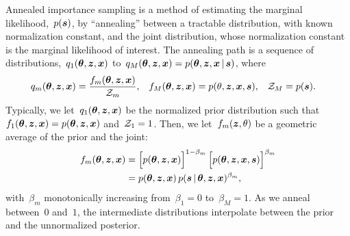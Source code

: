 \sloppy
Annealed importance sampling \citep{neal2001annealed} is a method of
estimating the marginal likelihood,~$p(\boldsymbol{s})$, by ``annealing'' between
a tractable distribution, with known normalization constant, and the
joint distribution, whose normalization constant is the marginal
likelihood of interest. The annealing path is a sequence of
distributions,~${q_1(\boldsymbol{\theta}, \boldsymbol{z}, \boldsymbol{x})}$ to~${q_M(\boldsymbol{\theta}, \boldsymbol{z}, \boldsymbol{x}) = p(\boldsymbol{\theta}, \boldsymbol{z}, \boldsymbol{x} \,|\, \boldsymbol{s})}$,
where
\begin{align*}
q_m(\boldsymbol{\theta}, \boldsymbol{z}, \boldsymbol{x}) &= \frac{f_m(\boldsymbol{\theta}, \boldsymbol{z}, \boldsymbol{x})}{\mathcal{Z}_m}, & 
f_M(\boldsymbol{\theta}, \boldsymbol{z}, \boldsymbol{x}) &= p(\theta, \boldsymbol{z}, \boldsymbol{x}, \boldsymbol{s}), & 
\mathcal{Z}_M &= p(\boldsymbol{s}).
\end{align*}
Typically, we let~$q_1(\boldsymbol{\theta}, \boldsymbol{z}, \boldsymbol{x})$ be the normalized prior
distribution such
that~${f_1(\boldsymbol{\theta}, \boldsymbol{z}, \boldsymbol{x}) = p(\boldsymbol{\theta}, \boldsymbol{z}, \boldsymbol{x})}$
and~${\mathcal{Z}_1=1}$. Then, we let~$f_m(\boldsymbol{z}, \theta)$ be a geometric
average of the prior and the joint:
\begin{align*}
  f_m(\boldsymbol{\theta}, \boldsymbol{z}, \boldsymbol{x}) 
  &=
  \Big[ p(\boldsymbol{\theta}, \boldsymbol{z}, \boldsymbol{x}) \Big]^{1-\beta_m} \,
  \Big[ p(\boldsymbol{\theta}, \boldsymbol{z}, \boldsymbol{x}, \boldsymbol{s}) \Big]^{\beta_m} \\
  &= p(\boldsymbol{\theta}, \boldsymbol{z}, \boldsymbol{x}) \, p(\boldsymbol{s} \,|\, \boldsymbol{\theta}, \boldsymbol{z}, \boldsymbol{x})^{\beta_m},
\end{align*}
with~$\beta_m$ monotonically increasing from~${\beta_1=0}$ to~${\beta_M=1}$.
As we anneal between~$0$ and~$1$, the intermediate distributions 
interpolate between the prior and the unnormalized posterior.

